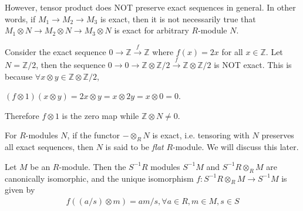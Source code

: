 \begin{remark}
\label{remark-tensor-product-not-exact}
However, tensor product does NOT preserve exact sequences in general.
In other words, if $M_1\rightarrow M_2\rightarrow M_3$ is
exact, then it is not necessarily true that
$M_1\otimes N\rightarrow M_2\otimes N\rightarrow M_3\otimes N$
is exact for arbitrary $R$-module $N$.
\end{remark}

\begin{example}
\label{example-tensor-product-not-exact}
Consider the exact sequence
$0\rightarrow \mathbb{Z}\xrightarrow{f} \mathbb{Z}$ where
$f(x) = 2x$ for all $x\in
\mathbb{Z}$. Let $N = \mathbb{Z}/2$, then the sequence
$0\rightarrow 0\rightarrow
\mathbb{Z}\otimes \mathbb{Z}/2 \xrightarrow{f}
\mathbb{Z}\otimes \mathbb{Z}/2$
is NOT exact. This is because
$\forall x\otimes y\in \mathbb{Z}\otimes \mathbb{Z}/2$,
\begin{center}
$(f\otimes 1)(x\otimes y) = 2x\otimes y = x\otimes 2y = x\otimes 0 = 0$.
\end{center}
Therefore $f\otimes 1$ is the zero map while $\mathbb{Z}\otimes N\neq 0$.
\end{example}

\begin{remark}
\label{remark-flat-module}
For $R$-modules $N$, if the
functor $-\otimes_{R} N$ is exact, i.e. tensoring
with $N$ preserves all exact
sequences, then $N$ is said to be \textit{flat} $R$-module.
We will discuss this later.
\end{remark}

\begin{lemma}
\label{lemma-tensor-localization}
Let $M$ be an $R$-module. Then the $S^{-1}R$ modules $S^{-1}M$
and $S^{-1}R\otimes_{R}M$ are canonically isomorphic, and the
unique isomorphism $f : S^{-1}R\otimes_{R}M\rightarrow S^{-1}M$
is given by
\begin{align}
f((a/s)\otimes m) = am/s, \forall a\in R, m\in M, s\in S
\end{align}
\end{lemma}

